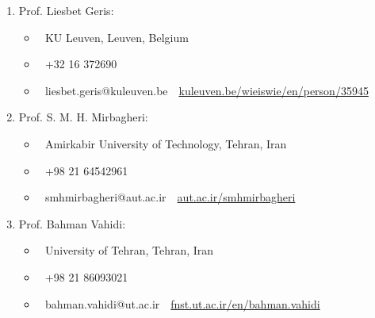 \documentclass{cv}
\begin{document}
\begin{enumerate}

\item
Prof. Liesbet Geris:
\begin{itemize}

\item[]
\faMapMarker \,\, KU Leuven, Leuven, Belgium

\item[]
\faPhone \,\,  +32 16 372690

\item[]
\faEnvelope \,\, liesbet.geris@kuleuven.be
\hfill
\faInternetExplorer \,\, \href{https://www.kuleuven.be/wieiswie/en/person/35945}{kuleuven.be/wieiswie/en/person/35945} 
\end{itemize}

\item
Prof. S. M. H. Mirbagheri:
\begin{itemize}

\item[]
\faMapMarker \,\, Amirkabir University of Technology, Tehran, Iran

\item[]
\faPhone \,\, +98 21 64542961

\item[]
\faEnvelope \,\, smhmirbagheri@aut.ac.ir
\hfill
\faInternetExplorer \,\, \href{http://www.aut.ac.ir/smhmirbagheri}{aut.ac.ir/smhmirbagheri} 
\end{itemize}

\item
Prof. Bahman Vahidi:
\begin{itemize}

\item[]
\faMapMarker \,\, University of Tehran, Tehran, Iran

\item[]
\faPhone \,\, +98 21 86093021

\item[]
\faEnvelope \,\, bahman.vahidi@ut.ac.ir
\hfill
\faInternetExplorer \,\, \href{http://fnst.ut.ac.ir/en/~bahman.vahidi}{fnst.ut.ac.ir/en/bahman.vahidi}

	
\end{itemize}

\end{enumerate}

\end{document}
